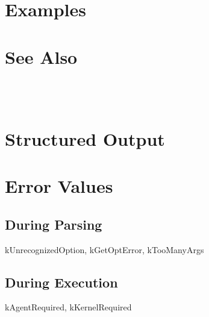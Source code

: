 \documentclass[10pt]{article}
\begin{document}
\section*{ Examples }
\section*{ See Also }


 \\ 



 \\ 

\section*{ Structured Output }
\section*{ Error Values }
\subsection*{ During Parsing }


 kUnrecognizedOption, kGetOptError, kTooManyArgs
\subsection*{ During Execution }


 kAgentRequired, kKernelRequired
\end{document}
